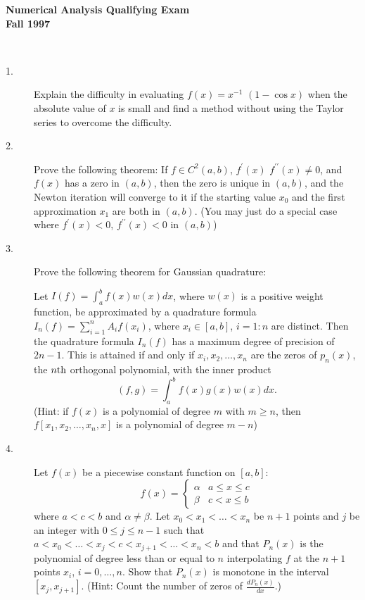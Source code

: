 \documentclass{article}
\begin{document}






\begin{center}\begin{LARGE}
{\bf Numerical Analysis Qualifying Exam}\\ 
{\bf Fall 1997}\\ \end{LARGE}
\end{center}
\vspace{0.1in}
\noindent\hrulefill\\
\begin{description}

\item[1.]
Explain the difficulty in evaluating $f(x) = x^{-1}$ $(1-\cos x)$
when the absolute value of $x$ is small and find a method without using
the Taylor series to overcome the difficulty.

\item[2.]
Prove the following theorem: If $f \in C^2(a,b)$, $f^\prime (x)$
$f^{\prime \prime} (x) \neq 0$, and $f(x)$ has a zero in $(a,b)$, then the
zero is unique in $(a,b)$, and the Newton iteration will converge to it if
the starting value $x_0$ and the first approximation $x_1$ are both
in $(a,b)$. (You may just do a special case where
$f^\prime (x) < 0$, $f^{\prime \prime} (x) <0$ in $(a,b)$)

\item[3.]
Prove the following theorem for Gaussian quadrature:

Let $I(f) = \int^b_a f(x) w(x) dx$, where $w(x)$ is a positive weight
function, be approximated by a quadrature formula
$I_n(f) = \sum^n_{i=1} A_i f(x_i)$, where $x_i \in [a,b]$, $i=1:n$
are distinct. Then the quadrature formula $I_n(f)$ has a maximum degree
of precision of $2n-1$. This is attained if and only if
$x_i, x_2, \dots, x_n$ are the zeros of $p_n(x)$, the $n\hbox{th}$ orthogonal
polynomial, with the inner product
$$ (f,g) = \int^b_a f(x) g(x) w(x) dx.$$
(Hint: if $f(x)$ is a polynomial of degree $m$ with $m \geq n$, then
$f[x_1, x_2, \dots, x_n, x]$ is a polynomial of degree $m-n$)

\item[4.]
Let $f(x)$ be a piecewise constant function on $[a,b]$:
$$f(x) = \begin{cases}
          \alpha &a \leq x \leq c \\
          \beta  &c < x \leq b
          \end{cases}$$
where $a<c<b$ and $\alpha \neq \beta$. Let $x_0 < x_1 < \dots < x_n$ be
$n+1$ points and $j$ be an integer with $0 \leq j \leq n-1$ such that
$a < x_0 < \dots < x_j < c < x_{j+1} < \dots < x_n < b$
and that $P_n(x)$ is the polynomial of degree less than or equal to $n$
interpolating $f$ at the $n+1$ points $x_i$, $i=0, \dots , n$.
Show that $P_n(x)$ is monotone in the interval $[x_j, x_{j+1}]$.
(Hint: Count the number of zeros of $\frac{dP_n(x)}{dx}$.)


\end{description}
\end{document}
